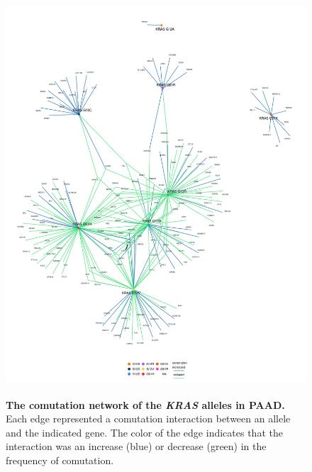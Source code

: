 \documentclass[english, 12pt, letterpaper]{article}
\newcommand{\KRAS}{\emph{KRAS}}
\begin{document}
\begin{figure}[p]
\centering
\includegraphics[height=150mm]{figures/SuppFigure_10.jpeg}
\caption{
    \textbf{The comutation network of the \KRAS{} alleles in PAAD.} Each edge represented a comutation interaction between an allele and the indicated gene. The color of the edge indicates that the interaction was an increase (blue) or decrease (green) in the frequency of comutation.
}
\label{sfig:paad_labeled-comutation}
\end{figure}
\end{document}
